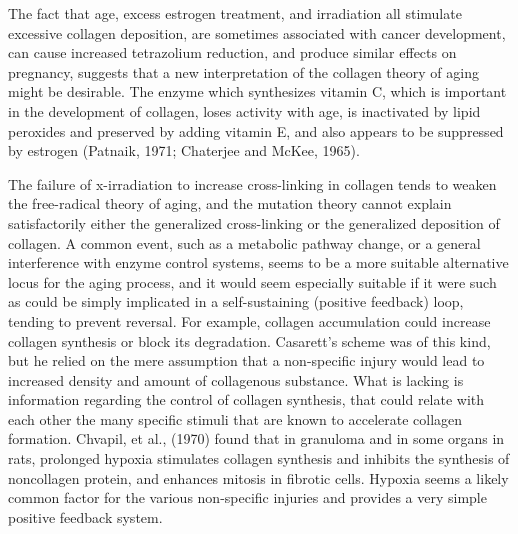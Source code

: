 The fact that age, excess estrogen treatment, and irradiation all stimulate excessive collagen deposition, are sometimes associated with cancer development, can cause increased tetrazolium reduction, and produce
similar effects on pregnancy, suggests that a new interpretation of the collagen theory of aging might be desirable. The enzyme which synthesizes vitamin C, which is important in the development of collagen, loses 
activity with age, is inactivated by lipid peroxides and preserved by adding vitamin E, and also appears to be suppressed by estrogen (Patnaik, 1971; Chaterjee and McKee, 1965).

The failure of x-irradiation to increase cross-linking in collagen tends to weaken the free-radical theory of aging, and the mutation theory cannot explain satisfactorily either the generalized cross-linking or the
generalized deposition of collagen. A common event, such as a metabolic pathway change, or a general interference with enzyme control systems, seems to be a more suitable alternative
locus for the aging process, and it would seem especially suitable if it were such as could be simply implicated in a self-sustaining (positive feedback) loop, tending to prevent reversal. For
example, collagen accumulation could increase collagen synthesis or block its degradation. Casarett's scheme was of this kind, but he relied on the mere assumption that a non-specific injury would
lead to increased density and amount of collagenous substance. What is lacking is information regarding the control of collagen synthesis, that could relate with each other the many specific stimuli that
are known to accelerate collagen formation. Chvapil, et al., (1970) found that in granuloma and in some organs in rats, prolonged hypoxia stimulates collagen synthesis and inhibits the synthesis
of noncollagen protein, and enhances mitosis in fibrotic cells. Hypoxia seems a likely common factor for the various non-specific injuries and provides a very simple positive feedback system.

